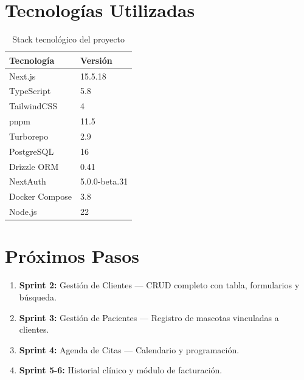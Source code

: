 \documentclass[12pt,a4paper]{article}
\begin{document}
\section{Tecnologías Utilizadas}

\begin{table}[h]
\centering
\caption{Stack tecnológico del proyecto}
\begin{tabularx}{\textwidth}{|l|X|}
\hline
\textbf{Tecnología} & \textbf{Versión} \\
\hline
Next.js & 15.5.18 \\
TypeScript & 5.8 \\
TailwindCSS & 4 \\
pnpm & 11.5 \\
Turborepo & 2.9 \\
PostgreSQL & 16 \\
Drizzle ORM & 0.41 \\
NextAuth & 5.0.0-beta.31 \\
Docker Compose & 3.8 \\
Node.js & 22 \\
\hline
\end{tabularx}
\end{table}

\section{Próximos Pasos}

\begin{enumerate}[leftmargin=*]
    \item \textbf{Sprint 2:} Gestión de Clientes — CRUD completo con tabla,
          formularios y búsqueda.
    \item \textbf{Sprint 3:} Gestión de Pacientes — Registro de mascotas
          vinculadas a clientes.
    \item \textbf{Sprint 4:} Agenda de Citas — Calendario y programación.
    \item \textbf{Sprint 5-6:} Historial clínico y módulo de facturación.
\end{enumerate}
\end{document}
